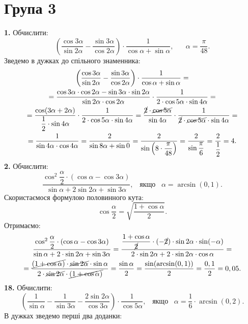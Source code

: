 \section*{Група 3}
\textbf{1.} Обчислити:
$$
\left(\dfrac{\cos3\alpha}{\sin2\alpha}-\dfrac{\sin3\alpha}{\cos2\alpha}\right)\cdot\dfrac{1}{\cos\alpha+\sin\alpha}, \;\;\; \mbox{} \;\;\; \alpha=\dfrac{\pi}{48}.
$$
Зведемо в дужках до спільного знаменника:
\begin{multline*}
\left(\dfrac{\cos3\alpha}{\sin2\alpha}-\dfrac{\sin3\alpha}{\cos2\alpha}\right)\cdot\dfrac{1}{\cos\alpha+\sin\alpha}=\\
=\dfrac{\cos3\alpha\cdot\cos2\alpha-\sin3\alpha\cdot\sin2\alpha}{\sin2\alpha\cdot\cos2\alpha}\cdot\dfrac{1}{2\cdot\cos5\alpha\cdot\sin4\alpha}=\\
=\dfrac{\cos(3\alpha+2\alpha)}{\dfrac{1}{2}\cdot\sin4\alpha}\cdot\dfrac{1}{2\cdot\cos5\alpha\cdot\sin4\alpha}=
\dfrac{\cancel{2}\cdot\cancel{\cos5\alpha}}{\sin4\alpha}\cdot\dfrac{1}{\cancel{2}\cdot\cancel{\cos5\alpha}\cdot\sin4\alpha}=\\
=\dfrac{1}{\sin4\alpha\cdot\cos4\alpha}=
\dfrac{2}{\sin8\alpha+\sin0}=
\dfrac{2}{\sin\left(8\cdot\dfrac{\pi}{48}\right)}=
\dfrac{2}{\sin\dfrac{\pi}{6}}=\dfrac{2}{\dfrac{1}{2}}=4.
\end{multline*}
\textbf{2.} Обчислити:
$$
\dfrac{\cos^2\dfrac{\alpha}{2}\cdot(\cos\alpha-\cos3\alpha)}{\sin\alpha+2\sin2\alpha+\sin3\alpha}, \;\;\; \mbox{якщо} \;\;\; \alpha=\arcsin(0,1).
$$
Скористаємося формулою половинного кута:
$$
\cos\dfrac{\alpha}{2}=\sqrt{\dfrac{1+\cos\alpha}{2}}.
$$
Отримаємо:
\begin{multline*}
\dfrac{\cos^2\dfrac{\alpha}{2}\cdot(\cos\alpha-\cos3\alpha)}{\sin\alpha+2\cdot\sin2\alpha+\sin3\alpha}=
\dfrac{\dfrac{1+\cos\alpha}{\cancel{2}}\cdot(-\cancel{2})\cdot\sin2\alpha\cdot\sin(-\alpha)}{2\cdot\sin2\alpha+2\cdot\sin2\alpha\cdot\cos\alpha}=\\
=\dfrac{\cancel{(1+\cos\alpha)}\cdot\cancel{\sin2\alpha}\cdot\sin\alpha}{2\cdot\cancel{\sin2\alpha}\cdot\cancel{(1+\cos\alpha)}}=
\dfrac{\sin\alpha}{2}=\dfrac{\sin(\arcsin(0,1))}{2}=\dfrac{0,1}{2}=0,05.
\end{multline*}
\textbf{18.} Обчислити:
$$
\left(\dfrac{1}{\sin\alpha}-\dfrac{1}{\sin3\alpha}-\dfrac{2\sin2\alpha}{\cos3\alpha}\right)\cdot\dfrac{1}{\cos5\alpha}, \;\;\; \mbox{якщо} \;\;\; \alpha=\dfrac{1}{6}\cdot\arcsin(0,2).
$$
В дужках зведемо перші два доданки:
